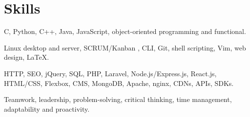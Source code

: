\section{Skills}
{C, Python, C++, Java, JavaScript, object-oriented programming and functional.}

{Linux desktop and server, SCRUM/Kanban , CLI, Git, shell scripting, Vim, web design, {\LaTeX}.}

{HTTP, SEO, jQuery, SQL, PHP, Laravel, Node.js/Express.js, React.js, HTML/CSS, Flexbox, CMS, MongoDB, Apache, nginx, CDNs, APIs, SDKs.}

{Teamwork, leadership, problem-solving, critical thinking, time management, adaptability and proactivity.}

